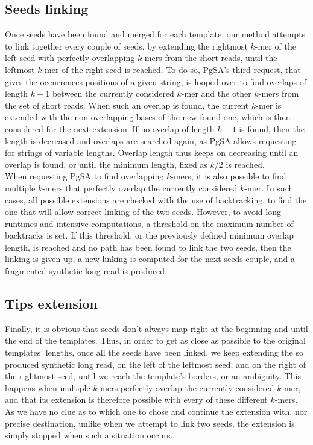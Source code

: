 \documentclass{bioinfo}
\begin{document}
\subsection{Seeds linking}
Once seeds have been found and merged for each template, our method attempts to link together every couple of seeds, by extending the rightmost $k$-mer of the left seed with perfectly overlapping $k$-mers from the short reads, until the leftmost $k$-mer of the right seed is reached. To do so, PgSA's third request, that gives the occurrences positions of a given string, is looped over to find overlaps of length $k - 1$ between the currently 
considered $k$-mer and the other $k$-mers from the set of short reads. When such an overlap is found, the current $k$-mer is extended
with the non-overlapping bases of the new found one, which is then considered for the next extension. If no overlap of length $k - 1$ is found, then the length is decreased and overlaps are searched again, as PgSA allows requesting for strings of variable lengths. Overlap length thus keeps on decreasing until an overlap is found, or until the minimum length, fixed as $k / 2$ is reached. \\
\indent When requesting PgSA to find overlapping $k$-mers, it is also possible to find multiple $k$-mers that perfectly overlap the currently considered $k$-mer. In such cases, all possible extensions are checked with the use of backtracking, to find the one that will allow correct linking of the two seeds. However, to avoid long runtimes and intensive computations, a threshold on the maximum number of backtracks is set. If this threshold, or the previously defined minimum overlap length, is reached and no path has been found to link the two seeds, then the linking is given up, a new linking is computed for the next seeds couple, and a fragmented synthetic long read is produced.

\subsection{Tips extension}
Finally, it is obvious that seeds don't always map right at the beginning and until the end of the templates. Thus, in order to get as close as possible to the original templates' lengths, once all the seeds have been linked, we keep extending the so produced synthetic long read, on the left of the leftmost seed, and on the right of the rightmost seed, until we reach the template's borders, or an ambiguity. This happens when multiple $k$-mers perfectly
overlap the currently considered $k$-mer, and that its extension is therefore possible with every of these different $k$-mers. As we have no clue as to which one to chose and continue the extension with, nor precise destination, unlike when we attempt to link two seeds, the extension is simply stopped when such a situation occurs. 
\end{document}
